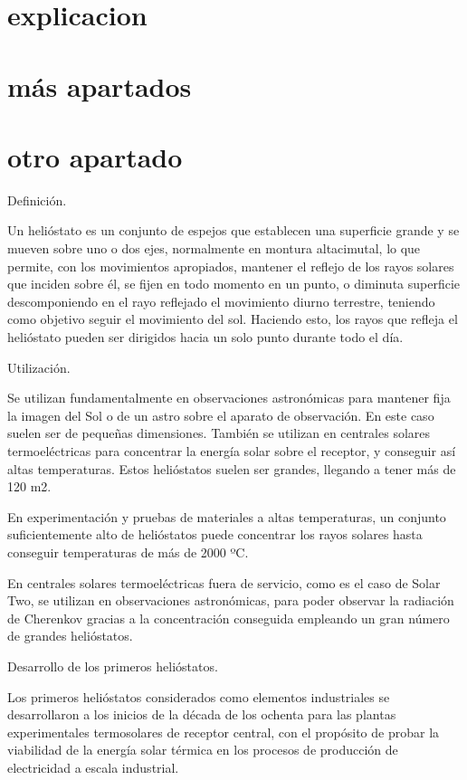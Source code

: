 \documentclass[12pt]{article}
\begin{document}
\section{explicacion}
\section{más apartados}
\section{otro apartado}

Definición.

Un helióstato es un conjunto de espejos que establecen una superficie grande y se mueven sobre uno o dos ejes, normalmente en montura altacimutal, lo que permite, con los movimientos apropiados, mantener el reflejo de los rayos solares que inciden sobre él, se fijen en todo momento en un punto, o diminuta superficie descomponiendo en el rayo reflejado el movimiento diurno terrestre, teniendo como objetivo seguir el movimiento del sol. Haciendo esto, los rayos que refleja el helióstato pueden ser dirigidos hacia un solo punto durante todo el día.


Utilización.

Se utilizan fundamentalmente en observaciones astronómicas para mantener fija la imagen del Sol o de un astro sobre el aparato de observación. En este caso suelen ser de pequeñas dimensiones. También se utilizan en centrales solares termoeléctricas para concentrar la energía solar sobre el receptor, y conseguir así altas temperaturas. Estos helióstatos suelen ser grandes, llegando a tener más de 120 m2.

En experimentación y pruebas de materiales a altas temperaturas, un conjunto suficientemente alto de helióstatos puede concentrar los rayos solares hasta conseguir temperaturas de más de 2000 ºC.

En centrales solares termoeléctricas fuera de servicio, como es el caso de Solar Two, se utilizan en observaciones astronómicas, para poder observar la radiación de Cherenkov gracias a la concentración conseguida empleando un gran número de grandes helióstatos.


Desarrollo de los primeros helióstatos.

Los primeros helióstatos considerados como elementos industriales se desarrollaron a los inicios de la década de los ochenta para las plantas experimentales termosolares de receptor central, con el propósito de probar la viabilidad de la energía solar térmica en los procesos de producción de electricidad a escala industrial.
\end{document}
